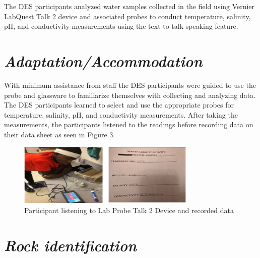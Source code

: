 \documentclass[11pt]{sig-alternate}
\begin{document}
\begin{large}
The DES participants analyzed water samples collected in the field using Vernier LabQuest Talk 2  device and associated probes to conduct temperature, salinity, pH, and conductivity measurements using the text to talk speaking feature. 

\section*{\textit{Adaptation/Accommodation}}

With minimum assistance from staff the DES participants were guided to use the probe and glassware to familiarize themselves with collecting and analyzing data. The DES participants learned to select and use the appropriate probes for temperature, salinity, pH, and conductivity measurements.  After taking the measurements, the participants listened to the readings before recording data on their data sheet as seen in Figure 3.
{\begin{figure}[htp] 
    \leftmargin
    \includegraphics[width=8.5cm]{figure3.png}
    \caption{Participant listening to Lab Probe Talk 2 Device and recorded data }
    \label{Lab Probe Talk 2 Device and recorded data }
\end{figure}
}

\section*{\textit{Rock identification}}


\end{large}
\end{document}
